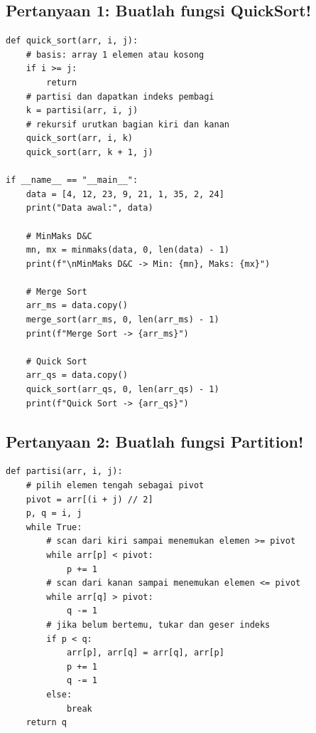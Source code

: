 \subsection*{Pertanyaan 1: Buatlah fungsi QuickSort!}

\begin{lstlisting}[basicstyle=\ttfamily\scriptsize, frame=single, backgroundcolor=\color{white}, numbers=none, keywordstyle=\color{black}, commentstyle=\color{black}, stringstyle=\color{black}, breaklines=true]
def quick_sort(arr, i, j):
    # basis: array 1 elemen atau kosong
    if i >= j:
        return
    # partisi dan dapatkan indeks pembagi
    k = partisi(arr, i, j)
    # rekursif urutkan bagian kiri dan kanan
    quick_sort(arr, i, k)
    quick_sort(arr, k + 1, j)

if __name__ == "__main__":
    data = [4, 12, 23, 9, 21, 1, 35, 2, 24]
    print("Data awal:", data)
    
    # MinMaks D&C
    mn, mx = minmaks(data, 0, len(data) - 1)
    print(f"\nMinMaks D&C -> Min: {mn}, Maks: {mx}")
    
    # Merge Sort
    arr_ms = data.copy()
    merge_sort(arr_ms, 0, len(arr_ms) - 1)
    print(f"Merge Sort -> {arr_ms}")
    
    # Quick Sort
    arr_qs = data.copy()
    quick_sort(arr_qs, 0, len(arr_qs) - 1)
    print(f"Quick Sort -> {arr_qs}")
\end{lstlisting}

\subsection*{Pertanyaan 2: Buatlah fungsi Partition!}

\begin{lstlisting}[basicstyle=\ttfamily\scriptsize, frame=single, backgroundcolor=\color{white}, numbers=none, keywordstyle=\color{black}, commentstyle=\color{black}, stringstyle=\color{black}, breaklines=true]
def partisi(arr, i, j):
    # pilih elemen tengah sebagai pivot
    pivot = arr[(i + j) // 2]
    p, q = i, j
    while True:
        # scan dari kiri sampai menemukan elemen >= pivot
        while arr[p] < pivot:
            p += 1
        # scan dari kanan sampai menemukan elemen <= pivot
        while arr[q] > pivot:
            q -= 1
        # jika belum bertemu, tukar dan geser indeks
        if p < q:
            arr[p], arr[q] = arr[q], arr[p]
            p += 1
            q -= 1
        else:
            break
    return q
\end{lstlisting}